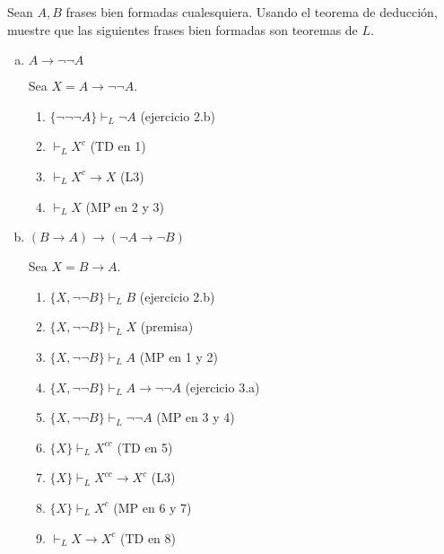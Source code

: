 \begin{exercise}
Sean $A,B$ frases bien formadas cualesquiera. Usando el teorema de deducción, muestre que las siguientes frases bien formadas son teoremas de $L$.
\end{exercise}

\begin{enumerate}[(a)]
    \item $A \to \neg \neg A$
    \begin{solution}
    Sea $X = A \to \neg \neg A$.
    \begin{enumerate}[1.]
        \item $\{ \neg \neg \neg A \} \vdash_L \neg A$ \hfill (ejercicio 2.b)
        \item $\vdash_L X^c$                       \hfill (TD en 1)
        \item $\vdash_L X^c \to X$                 \hfill (L3)
        \item $\vdash_L X$                         \hfill (MP en 2 y 3)
    \end{enumerate}
    \end{solution}
    
    \item $(B \to A) \to (\neg A \to \neg B)$
    \begin{solution}
    Sea $X = B \to A$.
    \begin{enumerate}[1.]
        \item $\{ X, \neg \neg B \} \vdash_L B$                 \hfill (ejercicio 2.b)
        \item $\{ X, \neg \neg B \} \vdash_L X$                 \hfill (premisa)
        \item $\{ X, \neg \neg B \} \vdash_L A$                 \hfill (MP en 1 y 2)
        \item $\{ X, \neg \neg B \} \vdash_L A \to \neg \neg A$ \hfill (ejercicio 3.a)
        \item $\{ X, \neg \neg B \} \vdash_L \neg \neg A$       \hfill (MP en 3 y 4)
        \item $\{ X \} \vdash_L X^{cc}$                         \hfill (TD en 5)
        \item $\{ X \} \vdash_L X^{cc} \to X^c$                 \hfill (L3)
        \item $\{ X \} \vdash_L X^c$                            \hfill (MP en 6 y 7)
        \item $\vdash_L X \to X^c$                              \hfill (TD en 8)
    \end{enumerate}
    \end{solution}
    

\end{enumerate}
